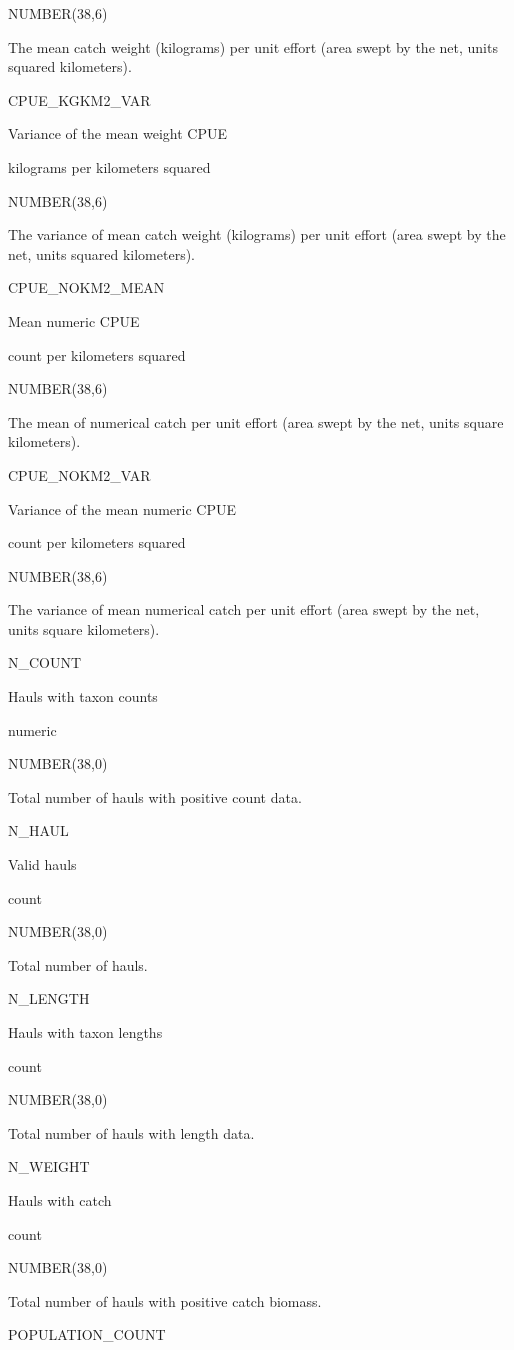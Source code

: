 \documentclass[
  letterpaper,
  oneside,
  open=any]{scrbook}
\begin{document}
NUMBER(38,6)

The mean catch weight (kilograms) per unit effort (area swept by the
net, units squared kilometers).

CPUE\_KGKM2\_VAR

Variance of the mean weight CPUE

kilograms per kilometers squared

NUMBER(38,6)

The variance of mean catch weight (kilograms) per unit effort (area
swept by the net, units squared kilometers).

CPUE\_NOKM2\_MEAN

Mean numeric CPUE

count per kilometers squared

NUMBER(38,6)

The mean of numerical catch per unit effort (area swept by the net,
units square kilometers).

CPUE\_NOKM2\_VAR

Variance of the mean numeric CPUE

count per kilometers squared

NUMBER(38,6)

The variance of mean numerical catch per unit effort (area swept by the
net, units square kilometers).

N\_COUNT

Hauls with taxon counts

numeric

NUMBER(38,0)

Total number of hauls with positive count data.

N\_HAUL

Valid hauls

count

NUMBER(38,0)

Total number of hauls.

N\_LENGTH

Hauls with taxon lengths

count

NUMBER(38,0)

Total number of hauls with length data.

N\_WEIGHT

Hauls with catch

count

NUMBER(38,0)

Total number of hauls with positive catch biomass.

POPULATION\_COUNT
\end{document}
